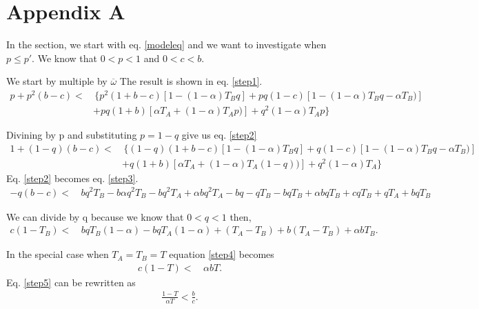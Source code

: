 \documentclass{article}
\begin{document}
\section*{Appendix A}
In the section, we start with eq. \eqref{modeleq} and we want to investigate when $p\leq p'$. We know that $0<p<1$ and $0<c<b$.

We start by multiple by $\overline{\omega}$ The result is shown in eq. \eqref{step1}.
\begin{equation} 
\begin{split} \label{step1}
p + p^2(b-c) < & \, \{ p^2(1+b-c)[1-(1-\alpha)T_Bq] + pq(1-c)[1-(1-\alpha)T_Bq-\alpha T_B)]\\
&+ pq(1+b)[\alpha T_A+(1-\alpha)T_Ap)] + q^2(1-\alpha)T_Ap\}
\end{split}
\end{equation}

Divining by p and substituting $p=1-q$ give us eq. \eqref{step2}
\begin{equation} 
\begin{split} \label{step2}
1 + (1-q)(b-c) < & \, \{ (1-q)(1+b-c)[1-(1-\alpha)T_Bq] + q(1-c)[1-(1-\alpha)T_Bq-\alpha T_B)]\\
&+ q(1+b)[\alpha T_A+(1-\alpha)T_A(1-q))] + q^2(1-\alpha)T_A\}
\end{split}
\end{equation}
Eq. \eqref{step2} becomes eq. \eqref{step3}.
\begin{equation} 
\begin{split}\label{step3}
 -q(b-c) < & \,  bq^2T_B-b\alpha q^2T_B - bq^2T_A + \alpha bq^2T_A - bq - qT_B - bqT_B + \alpha bqT_B +cqT_B + qT_A + bqT_B 
\end{split}
\end{equation}

We can divide by q because we know that $0<q<1$ then,
\begin{equation} 
\begin{split} \label{step4}
 c(1-T_B) < & \,  bqT_B(1-\alpha) - bqT_A(1-\alpha) + (T_A-T_B) + b(T_A - T_B) + \alpha bT_B.
\end{split}
\end{equation}

In the special case when $T_A = T_B = T$ equation \eqref{step4} becomes
\begin{equation} 
\begin{split}\label{step5}
c(1-T) < & \, \alpha bT.
\end{split}
\end{equation}
Eq. \eqref{step5} can be rewritten as
\begin{equation} 
\begin{split}
 \frac{1-T}{\alpha T} < \frac{b}{c}.
\end{split}
\end{equation}
\end{document}
